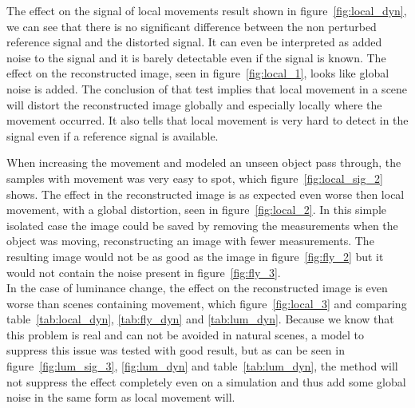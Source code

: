 The effect on the signal of local movements result shown in figure~\ref{fig:local_dyn}, we can see that there is no significant difference between the non perturbed reference signal and the distorted signal. It can even be interpreted as added noise to the signal and it is barely detectable even if the signal is known. The effect on the reconstructed image, seen in figure~\ref{fig:local_1}, looks like global noise is added. The conclusion of that test implies that local movement in a scene will distort the reconstructed image globally and especially locally where the movement occurred. It also tells that local movement is very hard to detect in the signal even if a reference signal is available.\\[0.1in] 

When increasing the movement and modeled an unseen object pass through, the samples with movement was very easy to spot, which figure~\ref{fig:local_sig_2} shows. The effect in the reconstructed image is as expected even worse then local movement, with a global distortion, seen in figure~\ref{fig:local_2}. In this simple isolated case the image could be saved by removing the measurements when the object was moving, reconstructing an image with fewer measurements. The resulting image would not be as good as the image in figure~\ref{fig:fly_2} but it would not contain the noise present in figure~\ref{fig:fly_3}. \\[0.1in]


In the case of luminance change, the effect on the reconstructed image is even worse than scenes containing movement, which figure~\ref{fig:local_3} and comparing table~\ref{tab:local_dyn}, \ref{tab:fly_dyn} and \ref{tab:lum_dyn}. Because we know that this problem is real and can not be avoided in natural scenes, a model to suppress this issue was tested with good result, but as can be seen in figure~\ref{fig:lum_sig_3}, \ref{fig:lum_dyn} and table~\ref{tab:lum_dyn}, the method will not suppress the effect completely even on a simulation and thus add some global noise in the same form as local movement will.\\[0.1in]

